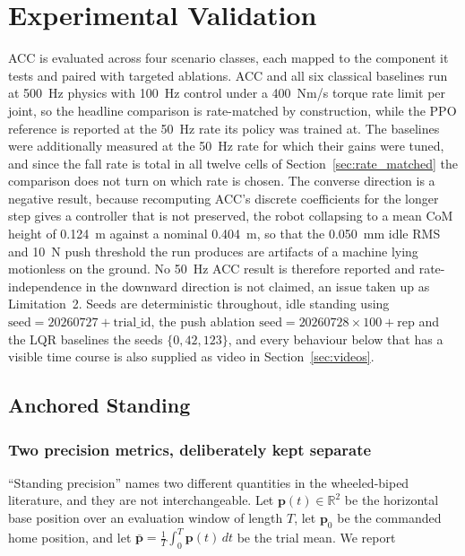 \documentclass[a4paper,fleqn]{cas-dc}
\begin{document}
\section{Experimental Validation}
\label{sec:results}

ACC is evaluated across four scenario classes, each mapped to the component it
tests and paired with targeted ablations. ACC and all six classical baselines run
at \SI{500}{Hz} physics with \SI{100}{Hz} control under a \SI{400}{Nm/s} torque
rate limit per joint, so the headline comparison is rate-matched by construction,
while the PPO reference is reported at the \SI{50}{Hz} rate its policy was
trained at. The baselines were additionally measured at the \SI{50}{Hz} rate for
which their gains were tuned, and since the fall rate is total in all twelve
cells of Section~\ref{sec:rate_matched} the comparison does not turn on which
rate is chosen. The converse direction is a negative result, because recomputing
ACC's discrete coefficients for the longer step gives a controller that is not
preserved, the robot collapsing to a mean CoM height of \SI{0.124}{m} against a
nominal \SI{0.404}{m}, so that the \SI{0.050}{mm} idle RMS and \SI{10}{N} push
threshold the run produces are artifacts of a machine lying motionless on the
ground. No \SI{50}{Hz} ACC result is therefore reported and rate-independence in
the downward direction is not claimed, an issue taken up as Limitation~2. Seeds
are deterministic throughout, idle standing using
$\text{seed}{=}20260727{+}\text{trial\_id}$, the push ablation
$\text{seed}{=}20260728{\times}100{+}\text{rep}$ and the LQR baselines the seeds
$\{0,42,123\}$, and every behaviour below that has a visible time course is also
supplied as video in Section~\ref{sec:videos}.

\subsection{Anchored Standing}
\label{sec:standing}

\subsubsection{Two precision metrics, deliberately kept separate}

``Standing precision'' names two different quantities in the wheeled-biped
literature, and they are not interchangeable. Let $\mathbf{p}(t)\in\mathbb{R}^2$ be
the horizontal base position over an evaluation window of length $T$, let
$\mathbf{p}_0$ be the commanded home position, and let
$\bar{\mathbf{p}}=\frac{1}{T}\int_0^T\mathbf{p}(t)\,dt$ be the trial mean. We report
\end{document}

